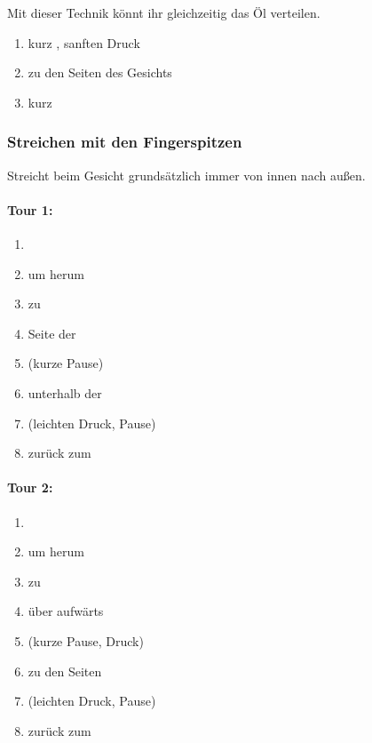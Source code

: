 Mit dieser Technik könnt ihr gleichzeitig das Öl verteilen.

\begin{enumerate}
	\item kurz , sanften Druck
	\item {} zu den Seiten des Gesichts
	\item kurz 
\end{enumerate}

\newpage
\subsubsection{Streichen mit den Fingerspitzen}

Streicht beim Gesicht grundsätzlich immer von innen nach außen.

\begin{multicols}{2}

\paragraph{Tour 1:}
\begin{enumerate}
	\item {}
	\item um  herum
	\item zu 
	\item Seite der 
	\item {} (kurze Pause)
	\item unterhalb der 
	\item {} (leichten Druck, Pause)
	\item zurück zum 
\end{enumerate}

\columnbreak

\paragraph{Tour 2:}
\begin{enumerate}
	\item {}
	\item um  herum
	\item zu 
	\item über  aufwärts
	\item {} (kurze Pause, Druck)
	\item {} zu den Seiten
	\item {} (leichten Druck, Pause)
	\item zurück zum 
\end{enumerate}

\end{multicols}


